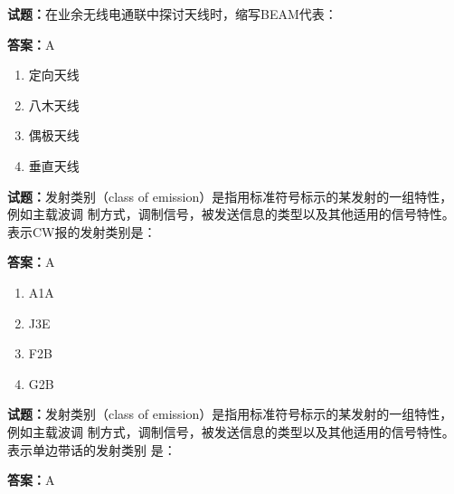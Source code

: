 \documentclass{ctexbook}
\begin{document}




\vspace{1em}

\textbf{试题：}在业余无线电通联中探讨天线时，缩写BEAM代表： 

\textbf{答案：}A 

\begin{enumerate}[leftmargin=3em]
  \item 定向天线 

  \item 八木天线 

  \item 偶极天线 

  \item 垂直天线 

\end{enumerate}





\vspace{1em}

\textbf{试题：}发射类别（class of emission）是指用标准符号标示的某发射的一组特性，例如主载波调
制方式，调制信号，被发送信息的类型以及其他适用的信号特性。表示CW报的发射类别是： 

\textbf{答案：}A 

\begin{enumerate}[leftmargin=3em]
  \item A1A 

  \item J3E 

  \item F2B 

  \item G2B 

\end{enumerate}





\vspace{1em}

\textbf{试题：}发射类别（class of emission）是指用标准符号标示的某发射的一组特性，例如主载波调
制方式，调制信号，被发送信息的类型以及其他适用的信号特性。表示单边带话的发射类别
是： 

\textbf{答案：}A 
\end{document}
